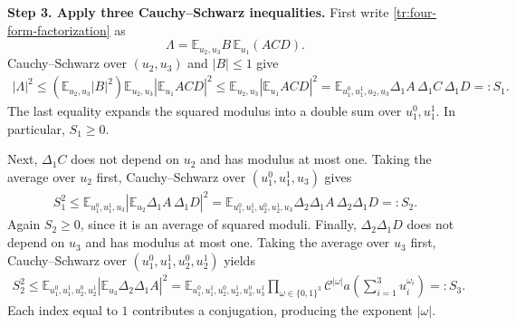 \documentclass[twoside]{aomart}
\makeatletter
\theoremstyle{paperplain}
\theoremstyle{paperdefinition}
\renewenvironment{proof}[1][\proofname]{\par\pushQED{\qed}%
  \normalfont\topsep6\p@\@plus3\p@\relax\trivlist
  \item[\hskip\labelsep\itshape #1\@addpunct{.}]\ignorespaces
}{\popQED\endtrivlist\@endpefalse}
\newcommand{\E}{\mathbb E}
\numberwithin{equation}{section}
\makeatother
\begin{document}
\begin{proof}
\medskip
\noindent\textbf{Step 3. Apply three Cauchy--Schwarz inequalities.}
First write \eqref{tr:four-form-factorization} as
$$\Lambda=\E_{u_2,u_3}B\,\E_{u_1}(ACD).$$
Cauchy--Schwarz over $(u_2,u_3)$ and $|B|\le1$ give
\begin{equation*}
 \begin{aligned}
 |\Lambda|^2
 \le\left(\E_{u_2,u_3}|B|^2\right)
       \E_{u_2,u_3}\left|\E_{u_1}ACD\right|^2
 \le\E_{u_2,u_3}\left|\E_{u_1}ACD\right|^2
 =\E_{u_1^0,u_1^1,u_2,u_3}
       \Delta_1A\,\Delta_1C\,\Delta_1D=:S_1.
 \end{aligned}
\end{equation*}
The last equality expands the squared modulus into a double sum
over $u_1^0,u_1^1$. In particular, $S_1\ge0$.

Next, $\Delta_1C$ does not depend on $u_2$ and has modulus at most
one. Taking the average over $u_2$ first, Cauchy--Schwarz over
$(u_1^0,u_1^1,u_3)$ gives
\begin{equation*}
 \begin{aligned}
 S_1^2
 \le\E_{u_1^0,u_1^1,u_3}
       \left|\E_{u_2}\Delta_1A\,\Delta_1D\right|^2
 =\E_{u_1^0,u_1^1,u_2^0,u_2^1,u_3}
       \Delta_2\Delta_1A\,\Delta_2\Delta_1D=:S_2.
 \end{aligned}
\end{equation*}
Again $S_2\ge0$, since it is an average of squared moduli.
Finally, $\Delta_2\Delta_1D$ does not depend on $u_3$ and has
modulus at most one. Taking the average over $u_3$ first,
Cauchy--Schwarz over $(u_1^0,u_1^1,u_2^0,u_2^1)$ yields
\begin{equation*}
 \begin{aligned}
 S_2^2
 \le\E_{u_1^0,u_1^1,u_2^0,u_2^1}
       \left|\E_{u_3}\Delta_2\Delta_1A\right|^2
 =\E_{u_1^0,u_1^1,u_2^0,u_2^1,u_3^0,u_3^1}
       \prod_{\omega\in\{0,1\}^3}\mathcal C^{|\omega|}
         a\left(\sum_{i=1}^3u_i^{\omega_i}\right)=:S_3.
 \end{aligned}
\end{equation*}
Each index equal to $1$ contributes a conjugation, producing
the exponent $|\omega|$.


\end{proof}
\end{document}
